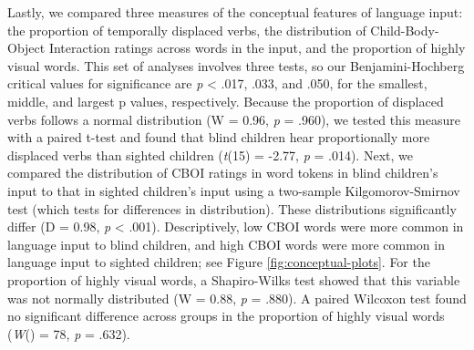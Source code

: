 \documentclass[
  man]{apa6}
\begin{document}
Lastly, we compared three measures of the conceptual features of language input: the proportion of temporally displaced verbs, the distribution of Child-Body-Object Interaction ratings across words in the input, and the proportion of highly visual words. This set of analyses involves three tests, so our Benjamini-Hochberg critical values for significance are \emph{p} \textless{} .017, .033, and .050, for the smallest, middle, and largest p values, respectively. Because the proportion of displaced verbs follows a normal distribution (W = 0.96, \emph{p} = .960), we tested this measure with a paired t-test and found that blind children hear proportionally more displaced verbs than sighted children (\emph{t}(15) = -2.77, \emph{p} = .014). Next, we compared the distribution of CBOI ratings in word tokens in blind children's input to that in sighted children's input using a two-sample Kilgomorov-Smirnov test (which tests for differences in distribution). These distributions significantly differ (D = 0.98, \emph{p} \textless{} .001). Descriptively, low CBOI words were more common in language input to blind children, and high CBOI words were more common in language input to sighted children; see Figure \ref{fig:conceptual-plots}. For the proportion of highly visual words, a Shapiro-Wilks test showed that this variable was not normally distributed (W = 0.88, \emph{p} = .880). A paired Wilcoxon test found no significant difference across groups in the proportion of highly visual words (\emph{W}() = 78, \emph{p} = .632).
\end{document}
